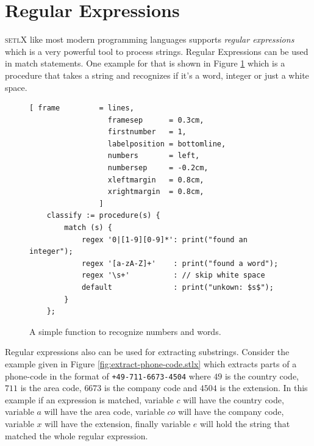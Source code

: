 \documentclass[11pt]{report}
\begin{document}
\section{Regular Expressions}
\textsc{setlX} like most modern programming languages supports \emph{regular expressions}\cite{RegularExpressions} which is a very powerful tool to process strings. Regular Expressions can be used in match statements. One example for that is shown in Figure \ref{fig:regexp.stlx} which is a procedure that takes a string and recognizes if it's a word, integer or just a white space.

\begin{figure}[!ht]
\centering
\begin{Verbatim}[ frame         = lines, 
                  framesep      = 0.3cm, 
                  firstnumber   = 1,
                  labelposition = bottomline,
                  numbers       = left,
                  numbersep     = -0.2cm,
                  xleftmargin   = 0.8cm,
                  xrightmargin  = 0.8cm,
                ]
    classify := procedure(s) {
        match (s) {
            regex '0|[1-9][0-9]*': print("found an integer");
            regex '[a-zA-Z]+'    : print("found a word");
            regex '\s+'          : // skip white space
            default              : print("unkown: $s$");
        }
    };
\end{Verbatim}
\vspace*{-0.3cm}
\caption{A simple function to recognize numbers and words.}
\label{fig:regexp.stlx}
\end{figure} 
Regular expressions also can be used for extracting substrings. Consider the example given in Figure \ref{fig:extract-phone-code.stlx} which extracts parts of a phone-code in the format of \texttt{+49-711-6673-4504} where $49$ is the country code, $711$ is the area code, $6673$ is the company code and $4504$ is the extension. In this example if an expression is matched, variable $c$ will have the country code, variable $a$ will have the area code, variable $co$ will have the company code, variable $x$ will have the extension, finally variable $e$ will hold the string that matched the whole regular expression.
\end{document}
